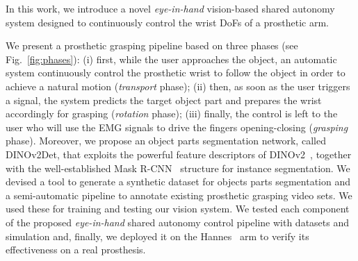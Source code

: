 In this work, we introduce a novel \textit{eye-in-hand} vision-based shared autonomy system designed to continuously control the wrist DoFs of a prosthetic arm.
\begin{comment}
\begin{itemize}
    \item We present a shared autonomy system for prosthetic grasping. This is based on an eye-in-hand computer vision-based approach that \textcolor{blue}{firstly allows to control the prosthetic wrist to follow the target object using visual servoing and then prepare it to conclude the grasp seamlessly through a prediction based on object parts}.
    \item We propose an object parts segmentation approach, called DINOv2Det, that exploits the powerful feature descriptors of DINOv2~\cite{oquab2023} together with the well-established Mask R-CNN~\cite{he2017} structure for instance segmentation.
    \item We devised a tool to generate a synthetic dataset for objects parts segmentation and a semi-automatic pipeline to annotate existing prosthetic grasping video sets. We used these for training and testing, our vision system.
    \item We tested each component of the proposed eye-in-hand shared autonomy control pipeline with datasets and simulation and, finally, we deployed it on the Hannes arm to verify its effectiveness on a real prosthesis.
\end{itemize}
\end{comment}
We present a prosthetic grasping pipeline based on three phases (see Fig.~\ref{fig:phases}): (i) first, while the user approaches the object, an automatic system continuously control the prosthetic wrist to follow the object in order to achieve a natural motion (\textit{transport} phase); (ii) then, as soon as the user triggers a signal, the system predicts the target object part and prepares the wrist accordingly for grasping (\textit{rotation} phase); (iii) finally, the control is left to the user who will use the EMG signals to drive the fingers opening-closing (\textit{grasping} phase). Moreover, we propose an object parts segmentation network, called DINOv2Det, that exploits the powerful feature descriptors of DINOv2~\cite{oquab2023}, together with the well-established Mask R-CNN~\cite{he2017} structure for instance segmentation. We devised a tool to generate a synthetic dataset for objects parts segmentation and a semi-automatic pipeline to annotate existing prosthetic grasping video sets. We used these for training and testing our vision system. We tested each component of the proposed \textit{eye-in-hand} shared autonomy control pipeline with datasets and simulation and, finally, we deployed it on the Hannes~\cite{laffranchi2020hannes} arm to verify its effectiveness on a real prosthesis.



